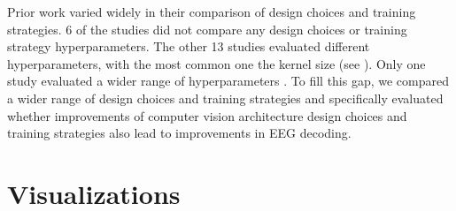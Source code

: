     Prior work varied widely in their comparison of design choices and
training strategies. 6 of the studies did not compare any design choices
or training strategy hyperparameters. The other 13 studies evaluated
different hyperparameters, with the most common one the kernel size (see
). Only one study
evaluated a wider range of hyperparameters
\citep{stober_using_2014}. To fill this gap, we compared a
wider range of design choices and training strategies and specifically
evaluated whether improvements of computer vision architecture design
choices and training strategies also lead to improvements in EEG
decoding.


\section{Visualizations}\label{visualizations}

